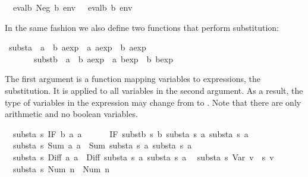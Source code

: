 \begin{isabellebody}
\ \ {\isachardoublequote}evalb\ {\isacharparenleft}Neg\ b{\isacharparenright}\ env\ {\isacharequal}\ {\isacharparenleft}{\isasymnot}\ evalb\ b\ env{\isacharparenright}{\isachardoublequote}%
\begin{isamarkuptext}%
\noindent
In the same fashion we also define two functions that perform substitution:%
\end{isamarkuptext}%
\ substa\ {\isacharcolon}{\isacharcolon}\ {\isachardoublequote}{\isacharparenleft}{\isacharprime}a\ {\isasymRightarrow}\ {\isacharprime}b\ aexp{\isacharparenright}\ {\isasymRightarrow}\ {\isacharprime}a\ aexp\ {\isasymRightarrow}\ {\isacharprime}b\ aexp{\isachardoublequote}\isanewline
\ \ \ \ \ \ \ substb\ {\isacharcolon}{\isacharcolon}\ {\isachardoublequote}{\isacharparenleft}{\isacharprime}a\ {\isasymRightarrow}\ {\isacharprime}b\ aexp{\isacharparenright}\ {\isasymRightarrow}\ {\isacharprime}a\ bexp\ {\isasymRightarrow}\ {\isacharprime}b\ bexp{\isachardoublequote}%
\begin{isamarkuptext}%
\noindent
The first argument is a function mapping variables to expressions, the
substitution. It is applied to all variables in the second argument. As a
result, the type of variables in the expression may change from 
to . Note that there are only arithmetic and no boolean variables.%
\end{isamarkuptext}%
\isanewline
\ \ {\isachardoublequote}substa\ s\ {\isacharparenleft}IF\ b\ a\ a\ {\isacharequal}\isanewline
\ \ \ \ \ IF\ {\isacharparenleft}substb\ s\ b{\isacharparenright}\ {\isacharparenleft}substa\ s\ a\ {\isacharparenleft}substa\ s\ a\isanewline
\ \ {\isachardoublequote}substa\ s\ {\isacharparenleft}Sum\ a\ a\ {\isacharequal}\ Sum\ {\isacharparenleft}substa\ s\ a\ {\isacharparenleft}substa\ s\ a\isanewline
\ \ {\isachardoublequote}substa\ s\ {\isacharparenleft}Diff\ a\ a\ {\isacharequal}\ Diff\ {\isacharparenleft}substa\ s\ a\ {\isacharparenleft}substa\ s\ a\isanewline
\ \ {\isachardoublequote}substa\ s\ {\isacharparenleft}Var\ v{\isacharparenright}\ {\isacharequal}\ s\ v{\isachardoublequote}\isanewline
\ \ {\isachardoublequote}substa\ s\ {\isacharparenleft}Num\ n{\isacharparenright}\ {\isacharequal}\ Num\ n{\isachardoublequote}\isanewline

\end{isabellebody}
